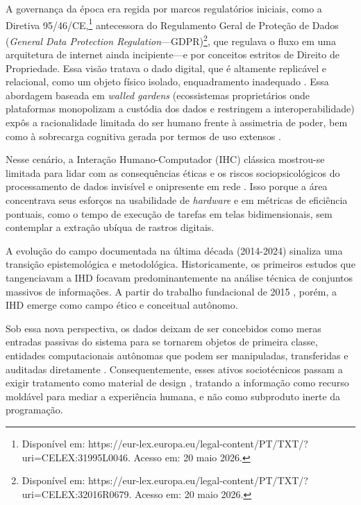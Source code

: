\documentclass[12pt]{article}
\begin{document}
    A governança da época era regida por marcos regulatórios iniciais, como a Diretiva 95/46/CE,\footnote{Disponível em: https://eur-lex.europa.eu/legal-content/PT/TXT/?uri=CELEX:31995L0046. Acesso em: 20 maio 2026.} antecessora do Regulamento Geral de Proteção de Dados (\textit{General Data Protection Regulation}---GDPR)\footnote{Disponível em: https://eur-lex.europa.eu/legal-content/PT/TXT/?uri=CELEX:32016R0679. Acesso em: 20 maio 2026.}, que regulava o fluxo em uma arquitetura de internet ainda incipiente---e por conceitos estritos de Direito de Propriedade. Essa visão tratava o dado digital, que é altamente replicável e relacional, como um objeto físico isolado, enquadramento inadequado \cite{malgieri2019automated, janecek2018ownership}. Essa abordagem baseada em \textit{walled gardens} (ecossistemas proprietários onde plataformas monopolizam a custódia dos dados e restringem a interoperabilidade) \cite{janecek2018ownership} expôs a racionalidade limitada do ser humano frente à assimetria de poder, bem como à sobrecarga cognitiva gerada por termos de uso extensos \cite{malgieri2020vulnerable, DOWTHWAITE2024, chalhoub2024useful}.
    
    Nesse cenário, a Interação Humano-Computador (IHC) clássica mostrou-se limitada para lidar com as consequências éticas e os riscos sociopsicológicos do processamento de dados invisível e onipresente em rede \cite{Parviainen2016, Calvetti2021173}. Isso porque a área concentrava seus esforços na usabilidade de \textit{hardware} e em métricas de eficiência pontuais, como o tempo de execução de tarefas em telas bidimensionais, sem contemplar a extração ubíqua de rastros digitais.

     A evolução do campo documentada na última década (2014-2024) sinaliza uma transição epistemológica e metodológica. Historicamente, os primeiros estudos que tangenciavam a IHD focavam predominantemente na análise técnica de conjuntos massivos de informações\cite{Parviainen2016, Meireles2016, Hornung2015}. A partir do trabalho fundacional de 2015 \cite{mortier2015humandatainteractionhumanface}, porém, a IHD emerge como campo ético e conceitual autônomo.

    Sob essa nova perspectiva, os dados deixam de ser concebidos como meras entradas passivas do sistema para se tornarem objetos de primeira classe, entidades computacionais autônomas que podem ser manipuladas, transferidas e auditadas diretamente \cite{Crabtree2016}. Consequentemente, esses ativos sociotécnicos passam a exigir tratamento como material de design \cite{seidelin2020foregrounding}, tratando a informação como recurso moldável para mediar a experiência humana, e não como subproduto inerte da programação.
\end{document}
